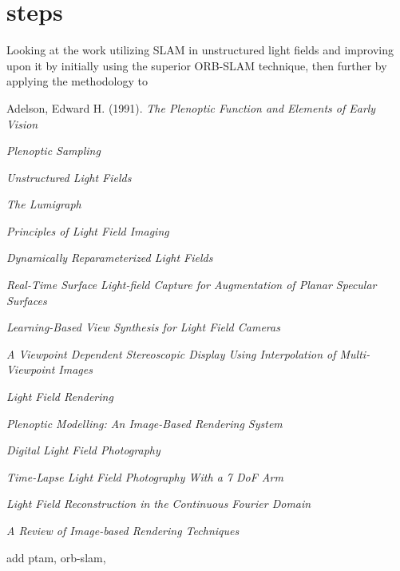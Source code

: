 \documentclass[12pt]{report}
\begin{document}
\section{steps}
Looking at the work utilizing SLAM in unstructured light fields and improving upon it by initially using the superior ORB-SLAM technique, then further by applying the methodology to 
\begin{thebibliography}{10}%

	Adelson, Edward H. (1991). \emph{The Plenoptic Function and Elements of Early Vision}

	\emph{Plenoptic Sampling}

	\emph{Unstructured Light Fields}

	\emph{The Lumigraph}
	
	\emph{Principles of Light Field Imaging}	
	
	\emph{Dynamically Reparameterized Light Fields}

	\emph{Real-Time Surface Light-field Capture for Augmentation of Planar Specular Surfaces}

	\emph{Learning-Based View Synthesis for Light Field Cameras}

	\emph{A Viewpoint Dependent Stereoscopic Display Using Interpolation of Multi-Viewpoint Images}
	
	\emph{Light Field Rendering}
	
	\emph{Plenoptic Modelling: An Image-Based Rendering System}

	\emph{Digital Light Field Photography}	

	\emph{Time-Lapse Light Field Photography With a 7 DoF Arm}

	\emph{Light Field Reconstruction in the Continuous Fourier Domain}

	\emph{A Review of Image-based Rendering Techniques}
	
	add ptam, orb-slam, 




\begin{comment}
\bibitem{Anderson01}
	Anderson, Jr., J.D. (2001). \emph{Fundamentals of Aerodynamics} McGraw Hill

\bibitem{Ariff11}
	Ariff, O.K. and Go, T.H. (2011). \emph{Waypoint Navigation of Small-Scale UAV incorporating Dynamic Soaring} The Journal of Navigation


\end{comment}
\end{thebibliography}
\end{document}
